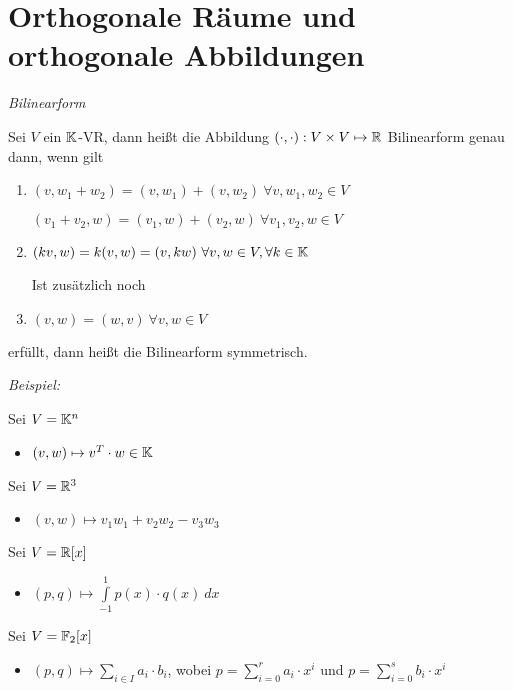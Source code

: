 \section{Orthogonale Räume und orthogonale Abbildungen}


\begin{mydef} \label{Bilinearform} \textit{Bilinearform}

    Sei $V$ ein $\mathbb{K}$-VR, dann heißt die Abbildung $(\cdot , \cdot ):V \times V \mapsto \mathbb{R}$ Bilinearform genau dann, wenn gilt
    \begin{enumerate}
        \item $(v, w_1 + w_2) = (v, w_1) + (v, w_2) \ \forall v, w_1, w_2 \in V$

            $(v_1+v_2,w)=(v_1,w) + (v_2,w) \ \forall v_1,v_2,w \in V$
        \item $(k v,w) = k(v,w) = (v, k w) \ \forall v, w \in V, \forall k \in \mathbb{K}$

            Ist zusätzlich noch
        \item $(v,w) = (w,v) \ \forall v ,w \in V$
    \end{enumerate}
    erfüllt, dann heißt die Bilinearform symmetrisch.
\end{mydef}

\textit{Beispiel:}

Sei $V = \mathbb{K}^n$
\begin{itemize}
    \item $(v,w) \mapsto v^T \cdot w \in \mathbb{K}$
\end{itemize}
Sei $V = \mathbb{R}^3$
\begin{itemize}
    \item $(v,w) \mapsto v_1 w_1 + v_2 w_2 - v_3 w_3$
\end{itemize}
Sei $V = \mathbb{R}[x]$
\begin{itemize}
    \item $(p,q) \mapsto \int\limits_{-1}^1 p(x) \cdot q(x) \ dx$
\end{itemize}
Sei $V=\mathbb{F}_2[x]$
\begin{itemize}
    \item $(p,q) \mapsto \sum\limits_{i \in I} a_i \cdot b_i$, wobei $p = \sum\limits_{i = 0}^r a_i \cdot x^i$ und $p = \sum\limits_{i = 0}^s b_i \cdot x^i$
\end{itemize}


